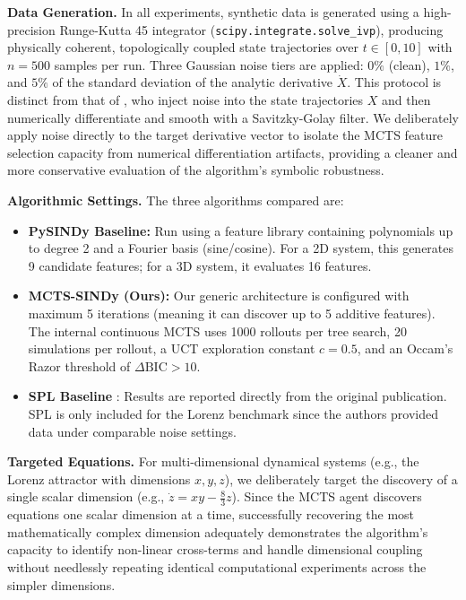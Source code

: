 \documentclass[11pt, a4paper]{article}
\begin{document}
\noindent \textbf{Data Generation.} In all experiments, synthetic data is generated using a high-precision Runge-Kutta 45 integrator (\texttt{scipy.integrate.solve\_ivp}), producing physically coherent, topologically coupled state trajectories over $t \in [0, 10]$ with $n = 500$ samples per run. Three Gaussian noise tiers are applied: $0\%$ (clean), $1\%$, and $5\%$ of the standard deviation of the analytic derivative $\dot{X}$. This protocol is distinct from that of \cite{sun2023spl}, who inject noise into the state trajectories $X$ and then numerically differentiate and smooth with a Savitzky-Golay filter. We deliberately apply noise directly to the target derivative vector to isolate the MCTS feature selection capacity from numerical differentiation artifacts, providing a cleaner and more conservative evaluation of the algorithm's symbolic robustness.

\vspace{0.3cm}
\noindent \textbf{Algorithmic Settings.} The three algorithms compared are:
\begin{itemize}
    \item \textbf{PySINDy Baseline:} Run using a feature library containing polynomials up to degree 2 and a Fourier basis (sine/cosine). For a 2D system, this generates 9 candidate features; for a 3D system, it evaluates 16 features.
    \item \textbf{MCTS-SINDy (Ours):} Our generic architecture is configured with maximum 5 iterations (meaning it can discover up to 5 additive features). The internal continuous MCTS uses 1000 rollouts per tree search, 20 simulations per rollout, a UCT exploration constant $c=0.5$, and an Occam's Razor threshold of $\Delta\text{BIC} > 10$.
    \item \textbf{SPL Baseline} \cite{sun2023spl}: Results are reported directly from the original publication. SPL is only included for the Lorenz benchmark since the authors provided data under comparable noise settings.
\end{itemize}

\vspace{0.3cm}
\noindent \textbf{Targeted Equations.} For multi-dimensional dynamical systems (e.g., the Lorenz attractor with dimensions $x, y, z$), we deliberately target the discovery of a single scalar dimension (e.g., $\dot{z} = xy - \frac{8}{3}z$). Since the MCTS agent discovers equations one scalar dimension at a time, successfully recovering the most mathematically complex dimension adequately demonstrates the algorithm's capacity to identify non-linear cross-terms and handle dimensional coupling without needlessly repeating identical computational experiments across the simpler dimensions.
\end{document}
